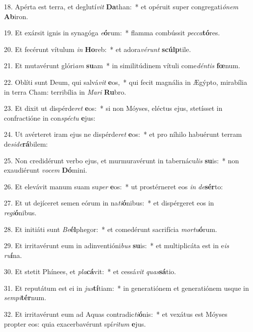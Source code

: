 18. Apérta est terra, et deglutí\textit{vit} \textbf{Da}than:~*  et opéruit super congregati\textit{ó}\textit{nem} \textbf{Ab}iron.\

19. Et exársit ignis in synagóga \textit{e}\textbf{ó}rum:~*  flamma combússit \textit{pec}\textit{ca}\textbf{tó}res.\

20. Et fecérunt vítulum \textit{in} \textbf{Ho}reb:~*  et adora\textit{vé}\textit{runt} \textbf{scúlp}tile.\

21. Et mutavérunt glóri\textit{am} \textbf{su}am~*  in similitúdinem vítuli come\textit{dén}\textit{tis} \textbf{fœ}num.\

22. Oblíti sunt Deum, qui salvá\textit{vit} \textbf{e}os,~*  qui fecit magnália in Ægýpto, mirabília in terra Cham: terribília in \textit{Ma}\textit{ri} \textbf{Ru}bro.\

23. Et dixit ut dispérde\textit{ret} \textbf{e}os:~*  si non Móyses, eléctus ejus, stetísset in confractióne in con\textit{spéc}\textit{tu} \textbf{e}jus:\

24. Ut avérteret iram ejus ne dispérde\textit{ret} \textbf{e}os:~*  et pro níhilo habuérunt terram de\textit{si}\textit{de}\textbf{rá}bilem:\

25. Non credidérunt verbo ejus, et murmuravérunt in tabernácu\textit{lis} \textbf{su}is:~*  non exaudiérunt \textit{vo}\textit{cem} \textbf{Dó}mini.\

26. Et elevávit manum suam su\textit{per} \textbf{e}os:~*  ut prostérneret eos \textit{in} \textit{de}\textbf{sér}to:\

27. Et ut dejíceret semen eórum in na\textit{ti}\textbf{ó}nibus:~*  et dispérgeret eos in \textit{re}\textit{gi}\textbf{ó}nibus.\

28. Et initiáti sunt \textit{Be}\textbf{él}phegor:~*  et comedérunt sacrifícia \textit{mor}\textit{tu}\textbf{ó}rum.\

29. Et irritavérunt eum in adinventióni\textit{bus} \textbf{su}is:~*  et multiplicáta est in e\textit{is} \textit{ru}\textbf{í}na.\

30. Et stetit Phínees, et \textit{pla}\textbf{cá}vit:~*  et cessá\textit{vit} \textit{quas}\textbf{sá}tio.\

31. Et reputátum est ei in \textit{jus}\textbf{tí}tiam:~*  in generatiónem et generatiónem usque in \textit{sem}\textit{pi}\textbf{tér}num.\

32. Et irritavérunt eum ad Aquas contradic\textit{ti}\textbf{ó}nis:~*  et vexátus est Móyses propter eos: quia exacerbavérunt spí\textit{ri}\textit{tum} \textbf{e}jus.\

